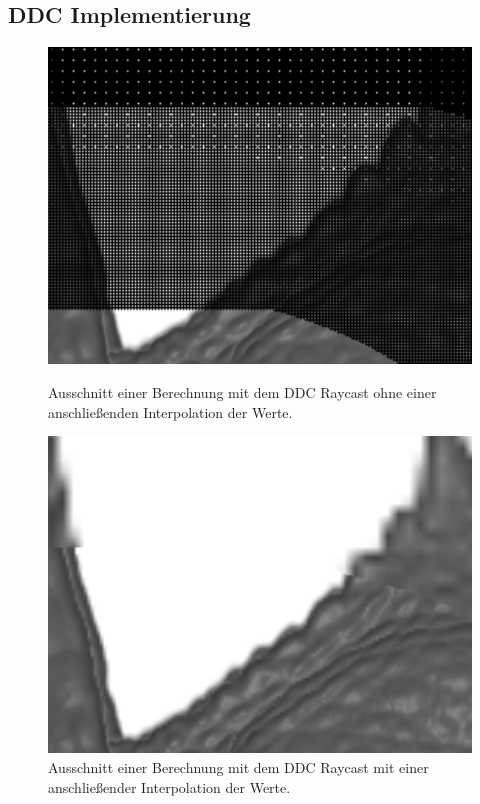 \subsection{DDC Implementierung}
\begin{figure}[]
	\centering
	\begin{minipage}[t]{0.49\textwidth}
		\centering
		\includegraphics[width=1\textwidth]{../../Grafiken/results/implementierung/ddc_o_ip_cut.png}
		\caption{Ausschnitt einer Berechnung mit dem DDC Raycast ohne einer anschließenden Interpolation der Werte.}
		\label{fig::imp::ddc_o_ip}
	\end{minipage}
	\hfill
	\begin{minipage}[t]{0.49\textwidth}
		\centering
		\includegraphics[width=1\textwidth]{../../Grafiken/results/implementierung/ddc_m_ip_cut.png}
		\caption{Ausschnitt einer Berechnung mit dem DDC Raycast mit einer anschließender Interpolation der Werte.}
		\label{fig::imp::ddc_m_ip}
	\end{minipage}
\end{figure}
